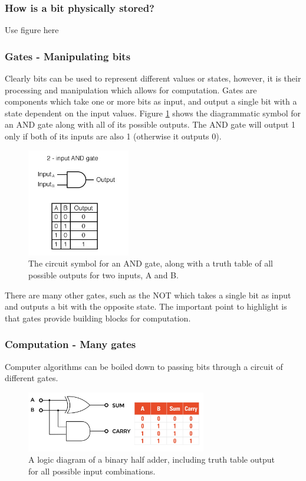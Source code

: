 \subsubsection{How is a bit physically stored?}
Use figure here
\subsubsection{Gates - Manipulating bits}
Clearly bits can be used to represent different values or states, however, it is their processing and manipulation which allows for computation. Gates are components which take one or more bits as input, and output a single bit with a state dependent on the input values. Figure \ref{fig:ANDGATE} shows the diagrammatic symbol for an AND gate along with all of its possible outputs. The AND gate will output 1 only if both of its inputs are also 1 (otherwise it outputs 0).
\begin{figure}[H]
    \centering
    \includegraphics[width=0.4\textwidth]{images/andgate.jpeg}
    \caption{The circuit symbol for an AND gate, along with a truth table of all possible outputs for two inputs, A and B. \cite{andgate}}\label{fig:ANDGATE}
\end{figure}

There are many other gates, such as the NOT which takes a single bit as input and outputs a bit with the opposite state. The important point to highlight is that gates provide building blocks for computation.

\subsubsection{Computation - Many gates}
Computer algorithms can be boiled down to passing bits through a circuit of different gates. 
\begin{figure}[H]
    \centering
    \includegraphics[width=0.7\textwidth]{images/adder.jpeg}
    \caption{A logic diagram of a binary half adder, including truth table output for all possible input combinations. \cite{adder}}\label{fig:ADDER}
\end{figure}

